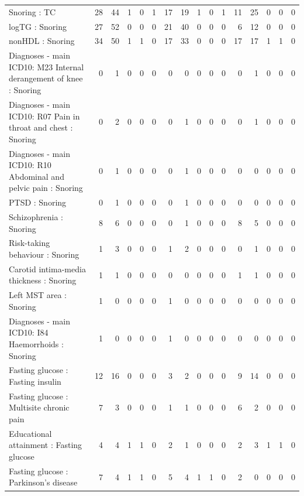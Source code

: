 \begin{table}[ht]
\begin{tabular}{lrrrrrrrrrrrrrrr}
  Snoring : TC &  28 &  44 &   1 &   0 &   1 &  17 &  19 &   1 &   0 &   1 &  11 &  25 &   0 &   0 &   0 \\ 
  logTG : Snoring &  27 &  52 &   0 &   0 &   0 &  21 &  40 &   0 &   0 &   0 &   6 &  12 &   0 &   0 &   0 \\ 
  nonHDL : Snoring &  34 &  50 &   1 &   1 &   0 &  17 &  33 &   0 &   0 &   0 &  17 &  17 &   1 &   1 &   0 \\ 
  Diagnoses - main ICD10: M23 Internal derangement of knee : Snoring &   0 &   1 &   0 &   0 &   0 &   0 &   0 &   0 &   0 &   0 &   0 &   1 &   0 &   0 &   0 \\ 
  Diagnoses - main ICD10: R07 Pain in throat and chest : Snoring &   0 &   2 &   0 &   0 &   0 &   0 &   1 &   0 &   0 &   0 &   0 &   1 &   0 &   0 &   0 \\ 
  Diagnoses - main ICD10: R10 Abdominal and pelvic pain : Snoring &   0 &   1 &   0 &   0 &   0 &   0 &   1 &   0 &   0 &   0 &   0 &   0 &   0 &   0 &   0 \\ 
  PTSD : Snoring &   0 &   1 &   0 &   0 &   0 &   0 &   1 &   0 &   0 &   0 &   0 &   0 &   0 &   0 &   0 \\ 
  Schizophrenia : Snoring &   8 &   6 &   0 &   0 &   0 &   0 &   1 &   0 &   0 &   0 &   8 &   5 &   0 &   0 &   0 \\ 
  Risk-taking behaviour : Snoring &   1 &   3 &   0 &   0 &   0 &   1 &   2 &   0 &   0 &   0 &   0 &   1 &   0 &   0 &   0 \\ 
  Carotid intima-media thickness : Snoring &   1 &   1 &   0 &   0 &   0 &   0 &   0 &   0 &   0 &   0 &   1 &   1 &   0 &   0 &   0 \\ 
  Left MST area : Snoring &   1 &   0 &   0 &   0 &   0 &   1 &   0 &   0 &   0 &   0 &   0 &   0 &   0 &   0 &   0 \\ 
  Diagnoses - main ICD10: I84 Haemorrhoids : Snoring &   1 &   0 &   0 &   0 &   0 &   1 &   0 &   0 &   0 &   0 &   0 &   0 &   0 &   0 &   0 \\ 
  Fasting glucose : Fasting insulin &  12 &  16 &   0 &   0 &   0 &   3 &   2 &   0 &   0 &   0 &   9 &  14 &   0 &   0 &   0 \\ 
  Fasting glucose : Multisite chronic pain &   7 &   3 &   0 &   0 &   0 &   1 &   1 &   0 &   0 &   0 &   6 &   2 &   0 &   0 &   0 \\ 
  Educational attainment : Fasting glucose &   4 &   4 &   1 &   1 &   0 &   2 &   1 &   0 &   0 &   0 &   2 &   3 &   1 &   1 &   0 \\ 
  Fasting glucose : Parkinson's disease &   7 &   4 &   1 &   1 &   0 &   5 &   4 &   1 &   1 &   0 &   2 &   0 &   0 &   0 &   0 \\ 

\end{tabular}
\end{table}
